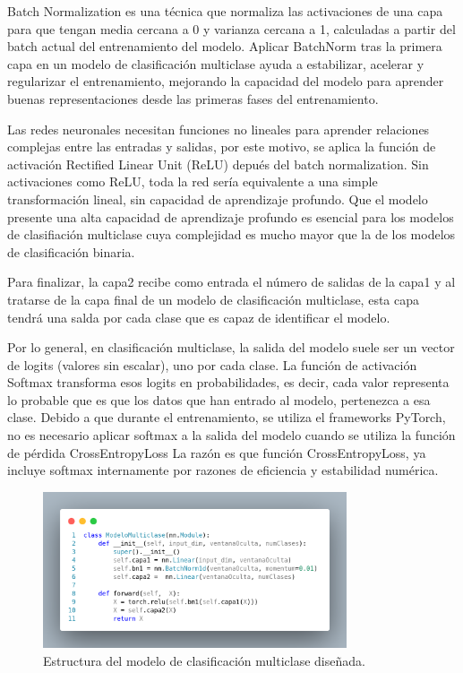 Batch Normalization es una técnica que normaliza las activaciones de una capa para que tengan media cercana a 0 y varianza cercana a 1, calculadas a partir del batch actual del entrenamiento del modelo. Aplicar BatchNorm tras la primera capa en un modelo de clasificación multiclase ayuda a estabilizar, acelerar y regularizar el entrenamiento, mejorando la capacidad del modelo para aprender buenas representaciones desde las primeras fases del entrenamiento.

Las redes neuronales necesitan funciones no lineales para aprender relaciones complejas entre las entradas y salidas, por este motivo, se aplica la función de activación Rectified Linear Unit (ReLU) depués del batch normalization. Sin activaciones como ReLU, toda la red sería equivalente a una simple transformación lineal, sin capacidad de aprendizaje profundo. Que el modelo presente una alta capacidad de aprendizaje profundo es esencial para los modelos de clasifiación multiclase cuya complejidad es mucho mayor que la de los modelos de clasificación binaria.

Para finalizar, la capa2 recibe como entrada el número de salidas de la capa1 y al tratarse de la capa final de un modelo de clasificación multiclase, esta capa tendrá una salda por cada clase que es capaz de identificar el modelo.

Por lo general, en clasificación multiclase, la salida del modelo suele ser un vector de logits (valores sin escalar), uno por cada clase. La función de activación Softmax transforma esos logits en probabilidades, es decir, cada valor representa lo probable que es que los datos que han entrado al modelo, pertenezca a esa clase. Debido a que durante el entrenamiento, se utiliza el frameworks PyTorch, no es necesario aplicar softmax a la salida del modelo cuando se utiliza la función de pérdida CrossEntropyLoss La razón es que función CrossEntropyLoss, ya incluye softmax internamente por razones de eficiencia y estabilidad numérica.

\begin{figure}[H]
    \centering
    \includegraphics[width=0.8\textwidth]{./img/modelo/modeloMUL.png}
    \caption{Estructura del modelo de clasificación multiclase diseñada.}
    \label{fig:modMUL}
\end{figure}

